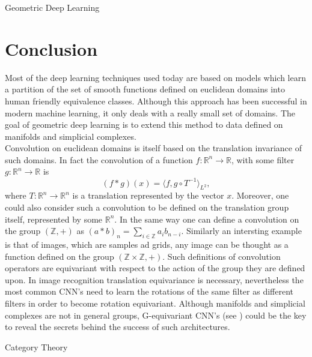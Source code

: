 \documentclass[12pt,a4paper]{report}
\theoremstyle{plain}
\theoremstyle{definition}
\theoremstyle{remark}
\newcommand{\Z}{\mathbb{Z}}
\newcommand{\R}{\mathbb{R}}
\newcommand{\scal}[2]{\langle #1, #2 \rangle}
\begin{document}
    \begin{chapter}{Geometric Deep Learning}
        \label{ch:3}
        
    \end{chapter}
    \newpage
   \chapter*{Conclusion}
        Most of the deep learning techniques used today are based on models which learn a partition of the set of smooth functions defined on euclidean 
        domains into human friendly equivalence classes. Although this approach has been successful in modern machine learning, it only deals with a really 
        small set of domains. The goal of geometric deep learning is to extend this method to data defined on manifolds and simplicial complexes.\\
        Convolution on euclidean domains is itself based on the translation invariance of such domains. In fact the convolution of a function $f : \R^n \to \R$,
        with some filter $g:\R^n \to \R$ is \[(f * g)(x) = \scal{f}{g \circ T^{-1}}_{L^2},\] where $T:\R^n \to \R^n$ is a translation represented by the vector $x$.
        Moreover, one could also consider such a convolution to be defined on the translation group itself, represented by some $\R^n$. 
        In the same way one can define a convolution on the group $(\Z,+)$ as $(a * b)_n = \sum_{i \in \Z}a_i b_{n-i}$.
        Similarly an intersting example is that of images, which are samples ad grids, any image can be thought as a function defined on the group $(\Z \times \Z, +)$.
        Such definitions of convolution operators are equivariant with respect to the action of the group they are defined upon.
        In image recognition translation equivariance is necessary, nevertheless the most common CNN's need to learn the rotations of the same filter as different 
        filters in order to become rotation equivariant. Although manifolds and simplicial complexes are not in general groups, G-equivariant CNN's (see \cite{gcnn})
        could be the key to reveal the secrets behind the success of such architectures.
    \begin{appendices}
        \begin{chapter}{Category Theory}
            \label{app:A}
            
        \end{chapter}
    \end{appendices}
    \newpage
    \printbibliography[heading = bibintoc]
\end{document}
